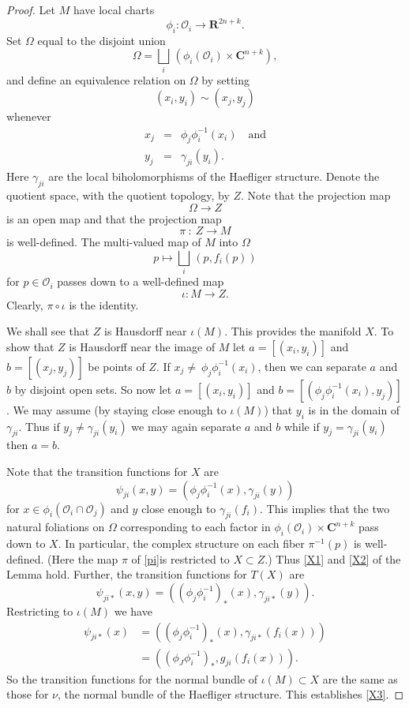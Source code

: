 \documentclass{amsart}
\begin{document}
\begin{proof}
Let $M$ have local charts\[
\phi _i:{\mathcal{O}} _i\to {\mathbf{R}} ^{2n+k}.
\]
Set $\Omega$ equal to the disjoint union 
\[
\Omega = \bigsqcup _i \, (\phi _i({\mathcal{O}} _i)\times {\mathbf{C}} ^{n+k}),
\]
and define an equivalence relation on $\Omega$ by setting
\[
(x_i,y_i)\sim (x_j,y_j)
\]
whenever
\begin{eqnarray}
x_j &=& \phi _j\phi _i^{-1} (x_i) \quad \mathrm{and}\\
y_j &=& \gamma _{ji}(y_i).
\end{eqnarray}
Here $\gamma _{ji}$ are the local biholomorphisms of the Haefliger
structure.  
Denote the quotient space, with the quotient topology, by $Z$. Note
that the projection map
\[  \Omega \to Z
\]
is an open map and that the projection map
\begin{equation}\label{pi}
\pi\ :\ Z\to M
\end{equation}
is well-defined.   The
multi-valued map of $M$ into $\Omega$
\[
p\mapsto \bigsqcup _i \,(p,f_i(p))
\]
for $p\in {\mathcal{O}} _i$ passes down to a well-defined map 
\[
\iota :M\to Z.
\]
Clearly, $\pi\circ\iota$ is the identity.  

We shall see that $Z$ is Hausdorff near $\iota (M)$. This provides 
the manifold $X$.  To show that $Z$ is Hausdorff near the image of $M$
let $a=[(x_i,y_i)] $ and $b=[(x_j,y_j)]$ be points of $Z$.  If
$x_j\neq \ \phi _j\phi _i^{-1}(x_i)$, then we can separate $a$ and $b$ by disjoint open sets.  So now
let $a=[(x_i,y_i)]$ and $b=[( \phi _j\phi _i^{-1}(x_i), y_j)]$.  We may assume
(by staying close enough to $\iota (M)$) that $y_i$ is in the domain of
$\gamma _{ji}$.  Thus if $y_j\neq \gamma_{ji} (y_i)$ we may again
separate $a$ and $b$ while if  $y_j= \gamma_{ji} (y_i)$ then $a=b$.

Note that the transition functions for $X$ are
\begin{equation} \label{X}
\psi _{ji} (x,y)=(\phi _j\phi _i^{-1}(x), \gamma_{ji}(y))
\end{equation}
for $x\in \phi _i({\mathcal{O}} _i\cap {\mathcal{O}}_j)$ and $y$ close enough to $\gamma _{ji}(f_i)$.  This
implies that the two natural foliations on $\Omega$ corresponding to
each factor in $\phi _i({\mathcal{O}}_i)\times {\mathbf{C}}^{n+k}$ pass down to $X$.  In
particular, the complex structure on each fiber $\pi ^{-1}(p)$ is
well-defined. (Here the map $\pi$ of \eqref{pi}is restricted to
$X\subset Z$.)
Thus
\eqref{X1} and \eqref{X2} of the Lemma hold. Further, the transition functions for $T(X)$ are
\[
\psi_{ji*}(x,y)=((\phi _j\phi_i^{-1})_*(x),\gamma_{ji*}(y)).
\]
Restricting to $\iota (M)$ we have
\begin{eqnarray*}
\psi_{ji*}(x)&= ((\phi _j\phi_i^{-1})_*(x),\gamma_{ji*}(f_i(x)))\\
&= ((\phi _J\phi_i^{-1})_*,g_{ji}(f_i(x))).
\end{eqnarray*}
So the transition functions for the normal bundle of $\iota (M)\subset
X$ are the same as those for $\nu$, the normal bundle of the Haefliger
structure.  This establishes \eqref{X3}.
\end{proof}
\end{document}
